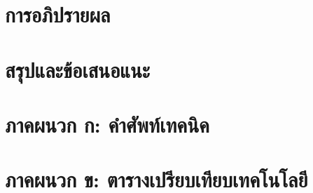 \documentclass[a4paper]{article}
\begin{document}
\section{การอภิปรายผล}

\section{สรุปและข้อเสนอแนะ}

\printbibliography[title=เอกสารอ้างอิง]

\appendix

\section{ภาคผนวก ก: คำศัพท์เทคนิค}

\section{ภาคผนวก ข: ตารางเปรียบเทียบเทคโนโลยี}
\end{document}
